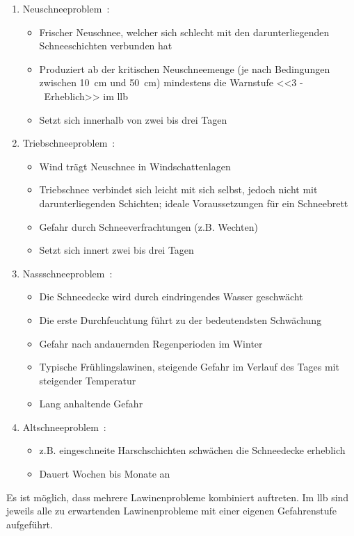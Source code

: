 \begin{enumerate}
  \item Neuschneeproblem~\cite{harveyrhynerschweizerlawinenkunde}\cite{achtunglawine}:
  \begin{itemize}
    \item Frischer Neuschnee, welcher sich schlecht mit den darunterliegenden Schneeschichten verbunden hat
    \item Produziert ab der kritischen Neuschneemenge (je nach Bedingungen zwischen \qty{10}{cm} und \qty{50}{cm}) mindestens die Warnstufe <<3 -~Erheblich>> im \acrfull{llb}
    \item Setzt sich innerhalb von zwei bis drei Tagen
  \end{itemize}
  \item Triebschneeproblem~\cite{harveyrhynerschweizerlawinenkunde}\cite{achtunglawine}:
  \begin{itemize}
    \item Wind trägt Neuschnee in Windschattenlagen
    \item Triebschnee verbindet sich leicht mit sich selbst, jedoch nicht mit darunterliegenden Schichten; ideale Voraussetzungen für ein Schneebrett
    \item Gefahr durch Schneeverfrachtungen (z.B. Wechten)
    \item Setzt sich innert zwei bis drei Tagen
  \end{itemize}
  \item Nassschneeproblem~\cite{harveyrhynerschweizerlawinenkunde}\cite{achtunglawine}:
  \begin{itemize}
    \item Die Schneedecke wird durch eindringendes Wasser geschwächt
    \item Die erste Durchfeuchtung führt zu der bedeutendsten Schwächung
    \item Gefahr nach andauernden Regenperioden im Winter
    \item Typische Frühlingslawinen, steigende Gefahr im Verlauf des Tages mit steigender Temperatur
    \item Lang anhaltende Gefahr
  \end{itemize}
  \item Altschneeproblem~\cite{harveyrhynerschweizerlawinenkunde}\cite{achtunglawine}:
  \begin{itemize}
    \item z.B. eingeschneite Harschschichten schwächen die Schneedecke erheblich
    \item Dauert Wochen bis Monate an
  \end{itemize}
\end{enumerate}
Es ist möglich, dass mehrere Lawinenprobleme kombiniert auftreten. Im \gls{llb} sind jeweils alle zu erwartenden Lawinenprobleme mit einer eigenen Gefahrenstufe aufgeführt.~\cite{slfTypischeLawinenprobleme}

